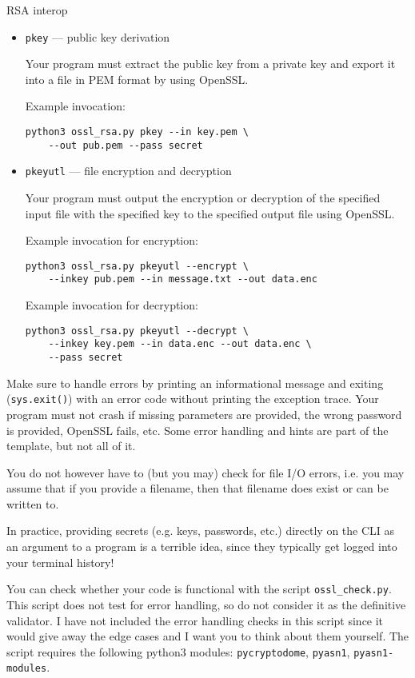 \documentclass{homework}
\begin{document}
\begin{task}{RSA interop}
\begin{itemize}
    \item \texttt{pkey} --- public key derivation
    
    Your program must extract the public key from a private key and export it into a file in PEM format by using OpenSSL.

    Example invocation:
    \begin{Verbatim}
python3 ossl_rsa.py pkey --in key.pem \
    --out pub.pem --pass secret
    \end{Verbatim}

    \item \texttt{pkeyutl} --- file encryption and decryption
    
    Your program must output the encryption or decryption of the specified input file with the specified key to the specified output file using OpenSSL.

    Example invocation for encryption:
    \begin{Verbatim}
python3 ossl_rsa.py pkeyutl --encrypt \
    --inkey pub.pem --in message.txt --out data.enc
    \end{Verbatim}

    Example invocation for decryption:
    \begin{Verbatim}
python3 ossl_rsa.py pkeyutl --decrypt \
    --inkey key.pem --in data.enc --out data.enc \
    --pass secret
    \end{Verbatim}
  \end{itemize}

  Make sure to handle errors by printing an informational message and exiting (\texttt{sys.exit()}) with an error code without printing the exception trace.
  Your program must not crash if missing parameters are provided, the wrong password is provided, OpenSSL fails, etc.
  Some error handling and hints are part of the template, but not all of it.

  You do not however have to (but you may) check for file I/O errors, i.e. you may assume that if you provide a filename, then that filename does exist or can be written to.

  \begin{tcolorbox}[title=Reminder]
    In practice, providing secrets (e.g. keys, passwords, etc.) directly on the CLI as an argument to a program is a terrible idea, since they typically get logged into your terminal history!
  \end{tcolorbox}

  You can check whether your code is functional with the script \texttt{ossl\_check.py}.
  This script does not test for error handling, so do not consider it as the definitive validator.
  I have not included the error handling checks in this script since it would give away the edge cases and I want you to think about them yourself.
  The script requires the following python3 modules: \texttt{pycryptodome}, \texttt{pyasn1}, \texttt{pyasn1-modules}.


\end{task}
\end{document}
